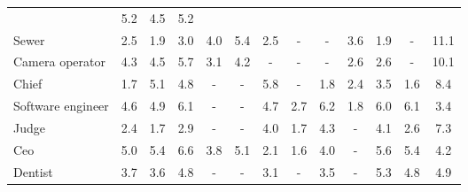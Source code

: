 \begin{table*}[p]
{\begin{tabular}{l|ccc|ccc|ccc|ccc}
& \cellcolor{orange2} 5.2 & \cellcolor{orange2} 4.5 & \cellcolor{blue2} 5.2
\\
Sewer
& \cellcolor{orange1} 2.5 & \cellcolor{orange1} 1.9 & \cellcolor{orange1} 3.0
& \cellcolor{orange2} 4.0 & \cellcolor{orange2} 5.4 & \cellcolor{orange1} 2.5
& \cellcolor{lightgray} - & \cellcolor{lightgray} - & \cellcolor{blue1} 3.6
& \cellcolor{orange1} 1.9 & \cellcolor{lightgray} - & \cellcolor{blue4} 11.1
\\
Camera operator
& \cellcolor{orange2} 4.3 & \cellcolor{orange2} 4.5 & \cellcolor{orange2} 5.7
& \cellcolor{orange1} 3.1 & \cellcolor{orange2} 4.2 & \cellcolor{lightgray} -
& \cellcolor{lightgray} - & \cellcolor{lightgray} - & \cellcolor{blue1} 2.6
& \cellcolor{orange1} 2.6 & \cellcolor{lightgray} - & \cellcolor{blue4} 10.1
\\
Chief
& \cellcolor{blue1} 1.7 & \cellcolor{blue2} 5.1 & \cellcolor{blue2} 4.8
& \cellcolor{lightgray} - & \cellcolor{lightgray} - & \cellcolor{blue2} 5.8
& \cellcolor{lightgray} - & \cellcolor{orange1} 1.8 & \cellcolor{blue1} 2.4
& \cellcolor{orange1} 3.5 & \cellcolor{orange1} 1.6 & \cellcolor{blue3} 8.4
\\
Software engineer
& \cellcolor{orange2} 4.6 & \cellcolor{orange2} 4.9 & \cellcolor{orange2} 6.1
& \cellcolor{lightgray} - & \cellcolor{lightgray} - & \cellcolor{blue2} 4.7
& \cellcolor{orange1} 2.7 & \cellcolor{orange2} 6.2 & \cellcolor{orange1} 1.8
& \cellcolor{orange2} 6.0 & \cellcolor{orange2} 6.1 & \cellcolor{blue1} 3.4
\\
Judge
& \cellcolor{orange1} 2.4 & \cellcolor{orange1} 1.7 & \cellcolor{orange1} 2.9
& \cellcolor{lightgray} - & \cellcolor{lightgray} - & \cellcolor{blue2} 4.0
& \cellcolor{orange1} 1.7 & \cellcolor{orange2} 4.3 & \cellcolor{lightgray} -
& \cellcolor{orange2} 4.1 & \cellcolor{orange1} 2.6 & \cellcolor{blue3} 7.3
\\
Ceo
& \cellcolor{orange2} 5.0 & \cellcolor{orange2} 5.4 & \cellcolor{orange3} 6.6
& \cellcolor{orange1} 3.8 & \cellcolor{orange2} 5.1 & \cellcolor{orange1} 2.1
& \cellcolor{orange1} 1.6 & \cellcolor{orange2} 4.0 & \cellcolor{lightgray} -
& \cellcolor{orange2} 5.6 & \cellcolor{orange2} 5.4 & \cellcolor{blue2} 4.2
\\
Dentist
& \cellcolor{orange1} 3.7 & \cellcolor{orange1} 3.6 & \cellcolor{orange2} 4.8
& \cellcolor{lightgray} - & \cellcolor{lightgray} - & \cellcolor{blue1} 3.1
& \cellcolor{lightgray} - & \cellcolor{orange1} 3.5 & \cellcolor{lightgray} -
& \cellcolor{orange2} 5.3 & \cellcolor{orange2} 4.8 & \cellcolor{blue2} 4.9
\\

\end{tabular}}
\end{table*}
